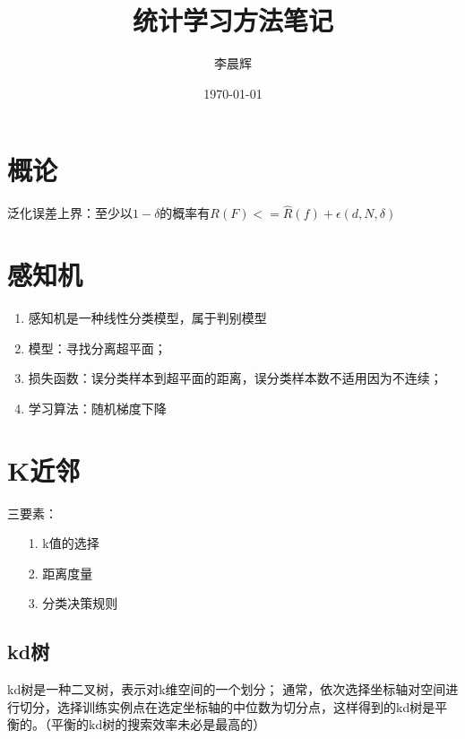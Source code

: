 \documentclass[UTF8]{article}%
\title{\heiti 统计学习方法笔记}
\author{\kaishu 李晨辉}
\date{\today}
\begin{document}
	\maketitle %
	\tableofcontents
	\flushleft
	\section{概论}
	泛化误差上界：至少以$1-\delta$的概率有$R(F)<=\hat{R}(f)+\epsilon(d,N,\delta)$
	\section{感知机}
	\begin{enumerate}
		\item 感知机是一种线性分类模型，属于判别模型
		\item 模型：寻找分离超平面；
		\item 损失函数：误分类样本到超平面的距离，误分类样本数不适用因为不连续；
		\item 学习算法：随机梯度下降
	\end{enumerate}
	
	\section{K近邻}
	三要素：
	\begin{enumerate}		
		\item[1.]k值的选择
		\item[2.] 距离度量
		\item[3.] 分类决策规则
	\end{enumerate}
	\subsection{kd树}
	kd树是一种二叉树，表示对k维空间的一个划分；
	通常，依次选择坐标轴对空间进行切分，选择训练实例点在选定坐标轴的中位数为切分点，这样得到的kd树是平衡的。（平衡的kd树的搜索效率未必是最高的）
	
\end{document}
